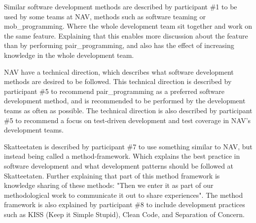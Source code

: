 Similar software development methods are described by participant \#1 to be used by some teams at NAV, methods such as software teaming or \gls{mob_programming}. Where the whole development team sit together and work on the same feature. Explaining that this enables more discussion about the feature than by performing \gls{pair_programming}, and also has the effect of increasing knowledge in the whole development team.


NAV have a technical direction, which describes what software development methods are desired to be followed. This technical direction is described by participant \#5 to recommend \gls{pair_programming} as a preferred software development method, and is recommended to be performed by the development teams as often as possible. The technical direction is also described by participant \#5 to recommend a focus on test-driven development and test coverage in NAV's development teams. 


Skatteetaten is described by participant \#7 to use something similar to NAV, but instead being called a method-framework. Which explains the best practice in software development and what development patterns should be followed at Skatteetaten. Further explaining that part of this method framework is knowledge sharing of these methods: "Then we enter it as part of our methodological work to communicate it out to share experiences". The method framework is also explained by participant \#8 to include development practices such as KISS (Keep it Simple Stupid), Clean Code, and Separation of Concern.


